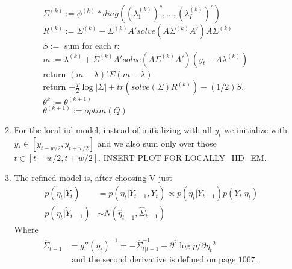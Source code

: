 \documentclass[paper=a4, fontsize=11pt]{scrartcl}
\begin{document}
\begin{enumerate}
\begin{enumerate}[1]
\begin{enumerate}[a.]
\begin{enumerate}[I.]
\begin{tabbing}
                  \hspace{2cm} $\Sigma^{(k)} := \phi^{(k)}*diag((\lambda_1^{(k)})^c, \ldots, (\lambda_I^{(k)})^c)$ \\
                  \hspace{2cm} $R^{(k)} := \Sigma^{(k)} - \Sigma^{(k)}A'solve(A\Sigma^{(k)}A')A\Sigma^{(k)}$ \\
                  \hspace{2cm} $S := $ sum for each $t$: \\
                  \hspace{3cm} $m := \lambda^{(k)} + \Sigma^{(k)}A'solve(A\Sigma^{(k)}A')(y_t - A\lambda^{(k)})$ \\
                  \hspace{3cm} return $(m - \lambda)'\Sigma(m - \lambda)$. \\
                  \hspace{2cm} return $-\frac{T}{2}\log{|\Sigma|} + tr(solve(\Sigma)R^{(k)}) - (1/2)S$. \\
                  \hspace{1cm} $\theta^{k} := \theta^{(k+1)}$ \\
                  \hspace{1cm} $\theta^{(k+1)} := optim(Q)$
                \end{tabbing}
            \end{enumerate}
        \end{enumerate}
      \item For the local iid model, instead of initializing with all $y_t$ we initialize with $y_t \in [y_{t - w/2}, y_{t+w/2}]$ and we also sum only over those $t \in [t - w/2, t + w/2]$. INSERT PLOT FOR LOCALLY\_IID\_EM.
      \item The refined model is, after choosing V just \\
      \begin{align*}
        p(\eta_t|\widetilde{Y_t}) &= p(\eta_t|\widetilde{Y}_{t-1}, Y_t) \propto p(\eta_t|\widetilde{Y}_{t-1})p(Y_t|\eta_t) \\
        p(\eta_t|\widetilde{Y}_{t-1}) &\sim N(\hat{\eta}_{t-1}, \hat{\Sigma}_{t-1})
      \end{align*}
      Where
      \begin{align*}
        \hat{\Sigma}_{t-1} &= g''(\eta_t)^{-1} = -\hat{\Sigma}^{-1}_{t|t-1} + \partial^2{\log{p}}/\partial{\eta_t}^2 \\
        & \text{ and the second derivative is defined on page 1067. } \\

\end{align*}
\end{enumerate}
\end{enumerate}
\end{document}
